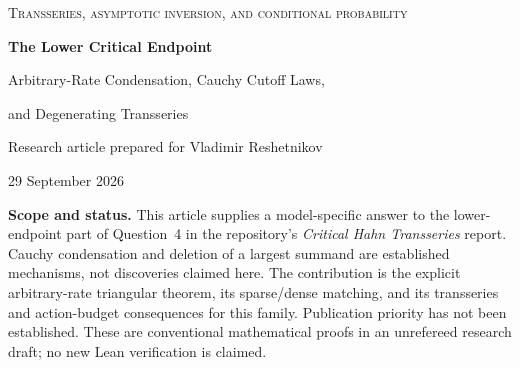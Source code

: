 \documentclass[11pt,a4paper]{article}
\numberwithin{equation}{section}
\theoremstyle{definition}
\theoremstyle{remark}
\newcommand{\ee}{\epsilon}
\DeclareMathOperator{\Li}{Li}
\begin{document}
\begin{center}
{\small\scshape Transseries, asymptotic inversion, and conditional probability}\par
\vspace{12pt}
{\LARGE\bfseries The Lower Critical Endpoint}\par
\vspace{8pt}
{\Large Arbitrary-Rate Condensation, Cauchy Cutoff Laws,\par and Degenerating Transseries}\par
\vspace{14pt}
{\normalsize Research article prepared for Vladimir Reshetnikov}\par
{\small 29 September 2026}\par
\end{center}
\vspace{6pt}
\begin{abstract}
We study the critical countable-action equation
\[
 U_\ee(q)=c_\ee\bigl(\Li_{2+\ee}(qe^{U_\ee(q)})+P(qe^{U_\ee(q)})\bigr),
 \qquad c_\ee=(\zeta(1+\ee)+P'(1))^{-1},
\]
where $P$ changes finitely many nonnegative action weights. For every joint
limit $n\to\infty$, $\ee=\ee_n\downarrow0$, with no restriction on its rate,
we prove
\[
 [q^n]U_\ee(q)\sim \rho_\ee^{-n}\frac{\ee}{n d_n},\qquad
 d_n=\left(\frac{nc_\ee}{\ee}\right)^{1/(1+\ee)},\quad
 \rho_\ee=e^{-c_\ee(\zeta(2+\ee)+P(1))}.
\]
The coefficient is produced by one exceptional action. Deleting that action
from the exactly conditioned Poisson configuration recovers the
unconditioned configuration in total variation. If $nc_\ee\to\infty$, the
remaining actions have a Cauchy-domain cloud on the scale
$b_n=(nc_\ee)^{1/(1+\ee)}$, and the largest action has a reflected, explicitly
normalized $1$-stable fluctuation about an exact truncated-mean center
$D_n$. Consequently, the minimal action cutoff retaining a fixed fraction
$r$ of the coefficient is $D_n+b_nF^{-1}(r)+o(b_n)$. Replacing $D_n$ by
$d_n$ is incorrect at that precision: their difference is asymptotic to
$b_n\log(1/\ee)$. The bounded-intensity regime has instead a discrete
compound-Poisson remainder. We also give a convergent two-coordinate
critical inverse chart, uniform through the removable parameter endpoint,
and explain why its endpoint is a degenerate equation rather than a new
nonzero critical function. All probabilistic estimates needed for the
moving-parameter limits are proved directly.
\end{abstract}
\noindent\textbf{Scope and status.}
This article supplies a model-specific answer to the lower-endpoint part of
Question~4 in the repository's \emph{Critical Hahn Transseries} report.
Cauchy condensation and deletion of a largest summand are established
mechanisms, not discoveries claimed here. The contribution is the explicit
arbitrary-rate triangular theorem, its sparse/dense matching, and its
transseries and action-budget consequences for this family. Publication
priority has not been established. These are conventional mathematical
proofs in an unrefereed research draft; no new Lean verification is claimed.
\end{document}
